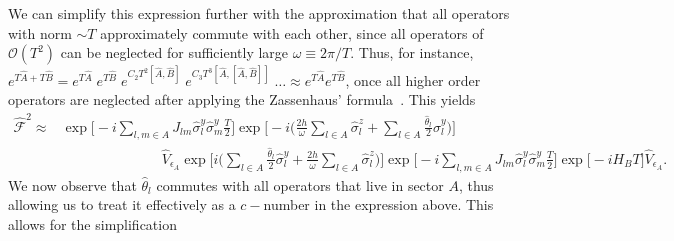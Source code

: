 \documentclass[%
nofootinbib,
reprint,
superscriptaddress,
amsmath,amssymb,showkeys,
aps,
prb,
]{revtex4-2}
\begin{document}
	We can simplify this expression further with the approximation that all operators with norm $\sim T$ approximately commute with each other, since all operators of $\mathcal{O}(T^2)$ can be neglected for sufficiently large $\omega\equiv 2\pi/T$. Thus, for instance, $e^{T\hat{A} + T\hat{B}}= e^{T\hat{A}}\; e^{T\hat{B}}\;e^{C_2 T^2\left[\hat{A}, \hat{B}\right]}\;e^{C_3 T^3\left[\hat{A},\left[\hat{A}, \hat{B}\right]\right]}\;\dots \approx e^{T\hat{A}} e^{T\hat{B}}$, once all higher order operators are neglected after applying the Zassenhaus' formula~\cite{Magnus1954}. This yields
		\begin{align}	
	\hat{\mathcal{F}}^2 	\approx& \exp\Bigg[-i \sum_{l,m\in A}J_{lm} \hat{\sigma}^y_l\hat{\sigma}^y_m\frac{T}{2}\Bigg] \exp\Bigg[-i\Big(\frac{2h}{\omega } \sum_{l\in A}^{}\hat{\sigma}^z_l + \sum_{l \in A}\frac{\hat{\theta}_{l}}{2}\hat{\sigma}^y_l\Big)\Bigg]\nonumber\\ 
		&\hspace{3cm} \hat{V}_{\epsilon_A} \exp\Bigg[i \Big(\sum_{l \in A}\frac{\hat{\theta}_{l}}{2}\hat{\sigma}^y_l + \frac{2h}{\omega} \sum_{l\in A}^{}\hat{\sigma}^z_l\Big)\Bigg] \exp\Bigg[-i\sum_{l,m\in A}J_{lm} \hat{\sigma}^y_l\hat{\sigma}^y_m\frac{T}{2}\Bigg] \exp\big[-i H_B T\big]\hat{V}_{\epsilon_A}.\nonumber
	\end{align}
	We now observe that $\hat{\theta}_l$ commutes with all operators that live in sector $A$, thus allowing us to treat it effectively as a $c-$number in the expression above. This allows for the simplification
\end{document}
